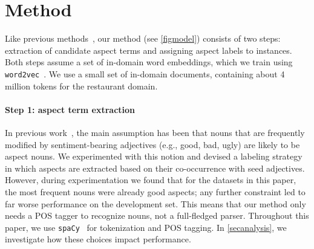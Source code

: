 \documentclass[11pt,a4paper]{article}
\begin{document}
\section{Method}

Like previous methods~\citep{hu2004mining, xu2013mining},
our method (see \autoref{figmodel}) consists of two steps:
extraction of candidate aspect terms and assigning aspect labels to instances.
Both steps assume a set of in-domain word embeddings, which we train using \texttt{word2vec}~\citep{mikolov2013efficient}. 
We use a small set of in-domain documents, containing about 4 million tokens for the restaurant domain.

\paragraph{Step 1: aspect term extraction}

In previous work~\citep{hu2004mining, xu2013mining}, the main assumption has been that nouns that are frequently modified by sentiment-bearing adjectives (e.g., good, bad, ugly) are likely to be aspect nouns.
We experimented with this notion and devised a labeling strategy in which aspects are extracted based on their co-occurrence with seed adjectives.
However, during experimentation we found that for the datasets in this paper, the most frequent nouns were already good aspects;
any further constraint led to far worse performance on the development set.
This means that our method only needs a POS tagger to recognize nouns, not a full-fledged parser.
Throughout this paper, we use \texttt{spaCy}~\citep{spacy2} for tokenization and POS tagging.
In \autoref{secanalysis},  we investigate how these choices impact performance.
\end{document}
